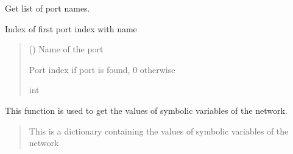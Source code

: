 \documentclass[letterpaper,10pt,english]{sphinxmanual}
\begin{document}
\begin{fulllineitems}

\begin{fulllineitems}
\label{\detokenize{touchstone:touchstone.spfile.get_port_names}}
\pysigstartsignatures
{}
\pysigstopsignatures
\sphinxAtStartPar
Get list of port names.

\end{fulllineitems}


\begin{fulllineitems}
\label{\detokenize{touchstone:touchstone.spfile.get_port_number_from_name}}
\pysigstartsignatures
{}
\pysigstopsignatures
\sphinxAtStartPar
Index of first port index with name 
\begin{quote}\begin{description}
\sphinxAtStartPar
{} () \textendash{} Name of the port

\sphinxAtStartPar
Port index if port is found, 0 otherwise

\sphinxAtStartPar
int

\end{description}\end{quote}

\end{fulllineitems}


\begin{fulllineitems}
\label{\detokenize{touchstone:touchstone.spfile.get_sym_parameters}}
\pysigstartsignatures
{}
\pysigstopsignatures
\sphinxAtStartPar
This function is used to get the values of symbolic variables of the network.
\begin{quote}\begin{description}
\sphinxAtStartPar
This is a dictionary containing the values of symbolic variables of the network


\end{description}
\end{quote}
\end{fulllineitems}
\end{fulllineitems}
\end{document}
